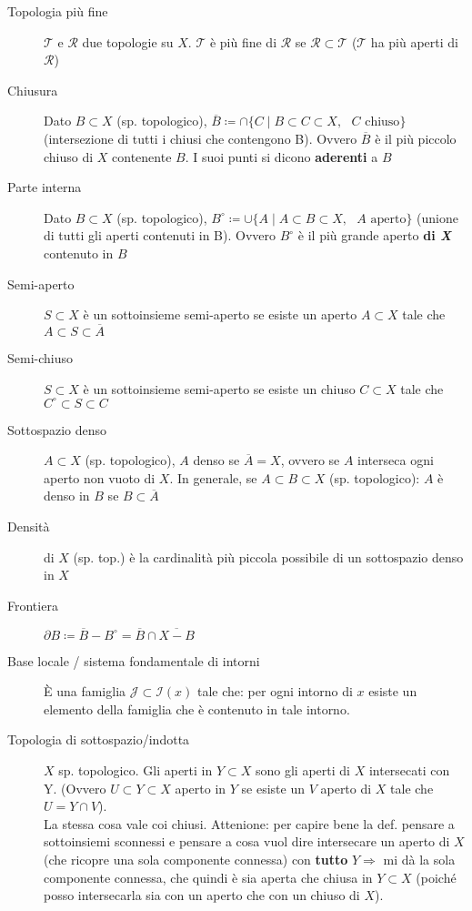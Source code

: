 \documentclass[a4paper,10pt]{article}
\theoremstyle{remark}
\theoremstyle{definition}
\begin{document}
\begin{description}
    \item[Topologia più fine] $\mathcal{T}$ e $\mathcal{R}$ due topologie su $X$. $\mathcal{T}$ è più fine di $\mathcal{R}$ se $\mathcal{R} \subset \mathcal{T} $ ($\mathcal{T}$ ha più aperti di $\mathcal{R}$) 

    \item[Chiusura] Dato $B \subset X$ (sp. topologico), $\overline{B} \coloneqq \cap \{ C \mid B \subset C \subset X, \mbox{ $C$ chiuso} \}$ (intersezione di tutti i chiusi che contengono B). Ovvero  $\overline{B}$ è il più piccolo chiuso di $X$ contenente $B$. I suoi punti si dicono \textbf{aderenti} a $B$

    \item[Parte interna] Dato $B \subset X$ (sp. topologico), $B^\circ \coloneqq \cup \{ A \mid A \subset B \subset X, \mbox{ $A$ aperto} \}$ (unione di tutti gli aperti contenuti in B). Ovvero  $B^\circ$ è il più grande aperto \textbf{di \textit{X}} contenuto in $B$

   \item[Semi-aperto] $S \subset X$ è un sottoinsieme semi-aperto se esiste un aperto $A \subset X$ tale che $A \subset S \subset \overline{A}$

    \item[Semi-chiuso] $S \subset X$ è un sottoinsieme semi-aperto se esiste un chiuso $C \subset X$ tale che $C^\circ \subset S \subset C$
    
    \item[Sottospazio denso] $A \subset X$ (sp. topologico), $A$ denso se $\overline{A}=X$, ovvero se $A$ interseca ogni aperto non vuoto di $X$. In generale, se $A \subset B \subset X$ (sp. topologico): $A$ è denso in $B$ se $B \subset \overline{A}$

    \item[Densità] di $X$ (sp. top.) è la cardinalità più piccola possibile di un sottospazio denso in $X$

    \item[Frontiera] $\partial B \coloneqq \overline{B}-B^\circ = \overline{B}\cap \overline{X-B}$

    \item[Base locale / sistema fondamentale di intorni] È una famiglia $\mathcal{J} \subset \mathcal{I}(x)$ tale che: per ogni intorno di $x$ esiste un elemento della famiglia che è contenuto in tale intorno.

    \item[Topologia di sottospazio/indotta] $X$ sp. topologico. Gli aperti in $Y \subset X$ sono gli aperti di $X$ intersecati con Y. (Ovvero $U \subset Y \subset X$ aperto in $Y$ se esiste un $V$ aperto di $X$ tale che $U = Y \cap V$). \\
    La stessa  cosa vale coi chiusi. Attenione: per capire bene la def. pensare a sottoinsiemi sconnessi e pensare a cosa vuol dire intersecare un aperto di $X$ (che ricopre una sola componente connessa) con  \textbf{tutto} $Y \Rightarrow$ mi dà la sola componente connessa, che quindi è sia aperta che chiusa in $Y \subset X$ (poiché posso intersecarla sia con un aperto che con un chiuso di  $X$).


\end{description}
\end{document}
